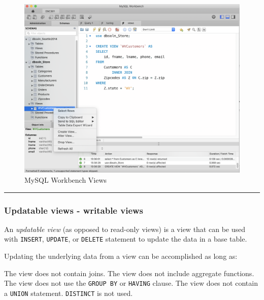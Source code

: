 \documentclass{article}
\begin{document}
\begin{figure}[h] %
   \centering
   \includegraphics[scale = 0.40]{figs/mysqlwb-views} 
   \caption{MySQL Workbench Views}
   \label{fig:mysqlwb}
\end{figure}














\hspace{-0.5cm}\rule[-0.101in]{\textwidth}{0.0025in}
   

\subsubsection*{Updatable views - writable views}
 
 An \textit{updatable view} (as opposed to read-only views) is a view that can be used with \texttt{INSERT},  \texttt{UPDATE}, or  \texttt{DELETE} statement to update the data in a base table.
  
 Updating the underlying data from a view can be accomplished as long as: 
\begin{outline}
	\1 The view does not contain joins.
	\1 The view does not include aggregate functions.
	\1 The view does not use the \texttt{GROUP BY} or \texttt{HAVING} clause.
	\1 The view does not contain a \texttt{UNION} statement.
	\1 \texttt{DISTINCT} is not used.
\end{outline}
  
\end{document}
